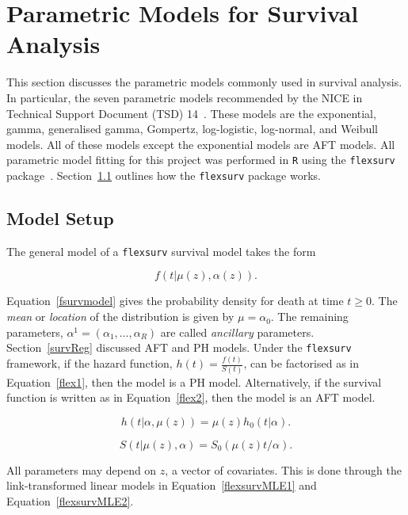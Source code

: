 \section{Parametric Models for Survival Analysis}
This section discusses the parametric models commonly used in survival analysis. In particular, the seven parametric models recommended by the NICE in Technical Support Document (TSD) 14~\cite{tsd14}. These models are the exponential, gamma, generalised gamma, Gompertz, log-logistic, log-normal, and Weibull models. All of these models except the exponential models are AFT models. All parametric model fitting for this project was performed in \verb|R| using the \verb|flexsurv| package~\cite{flexsurv}. Section~\ref{flexSetup} outlines how the \verb|flexsurv| package works.

\subsection{Model Setup}\label{flexSetup}
The general model of a \verb|flexsurv| survival model takes the form 

\begin{equation}
    \label{fsurvmodel}
    f(t|\mu(z), \alpha(z)).
\end{equation}

Equation~\ref{fsurvmodel} gives the probability density for death at time $t \geq 0$. The \textit{mean} or \textit{location} of the distribution is given by $\mu = \alpha_0$. The remaining parameters, $\alpha^1 = (\alpha_1, \ldots, \alpha_R)$ are called \textit{ancillary} parameters. \\

Section~\ref{survReg} discussed AFT and PH models. Under the \verb|flexsurv| framework, if the hazard function, $h(t) = \frac{f(t)}{S(t)}$, can be factorised as in Equation~\ref{flex1}, then the model is a PH model. Alternatively, if the survival function is written as in Equation~\ref{flex2}, then the model is an AFT model.

\begin{equation}
    h(t|\alpha, \mu(z)) = \mu(z)h_0(t|\alpha). 
    \label{flex1}
\end{equation}

\begin{equation}
    S(t|\mu(z), \alpha) = S_0(\mu(z)t/\alpha).  
    \label{flex2}
\end{equation}

All parameters may depend on $z$, a vector of covariates. This is done through the link-transformed linear models in Equation~\ref{flexsurvMLE1} and Equation~\ref{flexsurvMLE2}.

